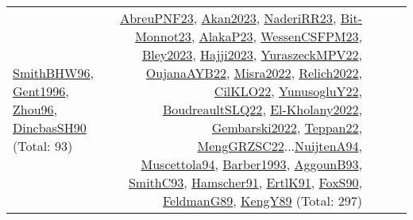 {\begin{longtable}{p{3cm}r>{\raggedright\arraybackslash}p{6cm}>{\raggedright\arraybackslash}p{6cm}>{\raggedright\arraybackslash}p{8cm}}
\hyperref[detail:SmithBHW96]{SmithBHW96}, \hyperref[detail:Gent1996]{Gent1996}, \hyperref[detail:Zhou96]{Zhou96}, \hyperref[detail:DincbasSH90]{DincbasSH90} (Total: 93) & \hyperref[detail:AbreuPNF23]{AbreuPNF23}, \hyperref[detail:Akan2023]{Akan2023}, \hyperref[detail:NaderiRR23]{NaderiRR23}, \hyperref[detail:Bit-Monnot23]{Bit-Monnot23}, \hyperref[detail:AlakaP23]{AlakaP23}, \hyperref[detail:WessenCSFPM23]{WessenCSFPM23}, \hyperref[detail:Bley2023]{Bley2023}, \hyperref[detail:Hajji2023]{Hajji2023}, \hyperref[detail:YuraszeckMPV22]{YuraszeckMPV22}, \hyperref[detail:OujanaAYB22]{OujanaAYB22}, \hyperref[detail:Misra2022]{Misra2022}, \hyperref[detail:Relich2022]{Relich2022}, \hyperref[detail:CilKLO22]{CilKLO22}, \hyperref[detail:YunusogluY22]{YunusogluY22}, \hyperref[detail:BoudreaultSLQ22]{BoudreaultSLQ22}, \hyperref[detail:El-Kholany2022]{El-Kholany2022}, \hyperref[detail:Gembarski2022]{Gembarski2022}, \hyperref[detail:Teppan22]{Teppan22}, \hyperref[detail:MengGRZSC22]{MengGRZSC22}...\hyperref[detail:NuijtenA94]{NuijtenA94}, \hyperref[detail:Muscettola94]{Muscettola94}, \hyperref[detail:Barber1993]{Barber1993}, \hyperref[detail:AggounB93]{AggounB93}, \hyperref[detail:SmithC93]{SmithC93}, \hyperref[detail:Hamscher91]{Hamscher91}, \hyperref[detail:ErtlK91]{ErtlK91}, \hyperref[detail:FoxS90]{FoxS90}, \hyperref[detail:FeldmanG89]{FeldmanG89}, \hyperref[detail:KengY89]{KengY89} (Total: 297)\\

\end{longtable}}
